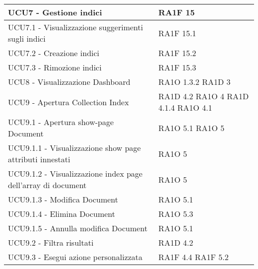 \begin{center}
\begin{longtable}{ | p{5cm} | p{5cm} |}
            UCU7 - Gestione indici &  RA1F 15 \newline  \\ \hline      
            UCU7.1 - Visualizzazione suggerimenti sugli indici &  RA1F 15.1 \newline  \\ \hline      
            UCU7.2 - Creazione indici &  RA1F 15.2 \newline  \\ \hline      
            UCU7.3 - Rimozione indici &  RA1F 15.3 \newline  \\ \hline      
            UCU8 - Visualizzazione Dashboard &  RA1O 1.3.2 \newline  RA1D 3  \newline  \\ \hline      
            UCU9 - Apertura Collection Index &  RA1D 4.2  \newline  RA1O 4 \newline  RA1D 4.1.4  \newline  RA1O 4.1  \newline  \\ \hline      
            UCU9.1 - Apertura show-page Document &  RA1O 5.1 \newline  RA1O 5  \newline  \\ \hline      
            UCU9.1.1 -  Visualizzazione show page attributi innestati &  RA1O 5  \newline  \\ \hline      
            UCU9.1.2 - Visualizzazione index page dell'array di document &  RA1O 5  \newline  \\ \hline      
            UCU9.1.3 - Modifica Document &  RA1O 5.1 \newline  \\ \hline      
            UCU9.1.4 - Elimina Document &  RA1O 5.3 \newline  \\ \hline      
            UCU9.1.5 - Annulla modifica Document &  RA1O 5.1 \newline  \\ \hline      
            UCU9.2 - Filtra risultati &  RA1D 4.2  \newline  \\ \hline      
            UCU9.3 - Esegui azione personalizzata &  RA1F 4.4 \newline  RA1F 5.2 \newline  \\ \hline      

\end{longtable}
\end{center}
